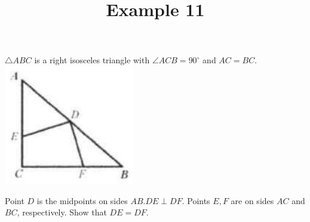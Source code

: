 \documentclass{article}
\title{Example 11}
\date{}
\begin{document}
\maketitle

\(\triangle A B C\) is a right isosceles triangle with \(\angle A C B=90^{\circ}\) and \(A C=B C\).\\
\centering
\includegraphics[width=\textwidth]{images/problem_image_1.jpg}

Point \(D\) is the midpoints on sides \(A B . D E \perp D F\). Points \(E, F\) are on sides \(A C\) and \(B C\), respectively. Show that \(D E=D F\).
\end{document}
